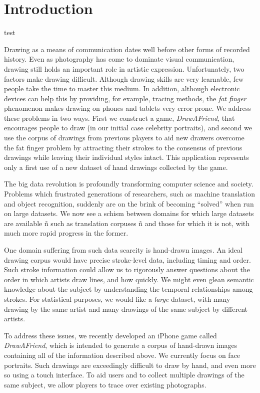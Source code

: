 \section{Introduction}

test

Drawing as a means of communication dates well before other forms of
recorded history. Even as photography has come to dominate visual
communication, drawing still holds an important role in artistic
expression. Unfortunately, two factors make drawing difficult.
Although drawing skills are very learnable, few people take the time
to master this medium. In addition, although electronic devices can
help this by providing, for example, tracing methods, the {\em fat
finger} phenomenon makes drawing on phones and tablets very error
prone. We address these problems in two ways. First we construct a
game, {\em DrawAFriend}, that encourages people to draw (in our
initial case celebrity portraits), and second we use the corpus of
drawings from previous players to aid new drawers overcome the fat
finger problem by attracting their strokes to the consensus of
previous drawings while leaving their individual styles intact. This
application represents only a first use of a new dataset of hand
drawings collected by the game.

The big data revolution is profoundly transforming computer science
and society. Problems which frustrated generations of researchers,
such as machine translation and object recognition, suddenly are on
the brink of becoming ``solved'' when run on large datasets. We now
see a schism between domains for which large datasets are available
ñ such as translation corpuses ñ and those for which it is not,
with much more rapid progress in the former.

One domain suffering from such data scarcity is hand-drawn images.
An ideal drawing corpus would have precise stroke-level data,
including timing and order. Such stroke information could allow us
to rigorously answer questions about the order in which artists draw
lines, and how quickly. We might even glean semantic knowledge about
the subject by understanding the temporal relationships among
strokes. For statistical purposes, we would like a \emph{large}
dataset, with many drawing by the same artist and many drawings of
the same subject by different artists.

To address these issues, we recently developed an iPhone game called
\emph{DrawAFriend}, which is intended to generate a corpus of
hand-drawn images containing all of the information described above.
We currently focus on face portraits. Such drawings are exceedingly
difficult to draw by hand, and even more so using a touch interface.
To aid users and to collect multiple drawings of the same subject,
we allow players to trace over existing photographs.

